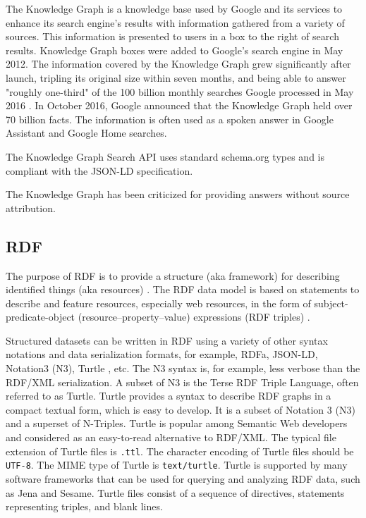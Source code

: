 The Knowledge Graph is a knowledge base used by Google and its services to enhance its search engine's results with information gathered from a variety of sources. This information is presented to users in a box to the right of search results. Knowledge Graph boxes were added to Google's search engine in May 2012. The information covered by the Knowledge Graph grew significantly after launch, tripling its original size within seven months, and being able to answer "roughly one-third" of the 100 billion monthly searches Google processed in May 2016 \cite{Knowledge_Graph}.
In October 2016, Google announced that the Knowledge Graph held over 70 billion facts. The information is often used as a spoken answer in Google Assistant and Google Home searches. 

The Knowledge Graph Search API uses standard schema.org types and is compliant with the JSON-LD specification.

The Knowledge Graph has been criticized for providing answers without source attribution.

\subsection{RDF}
\label{sec:RDF}
The purpose of RDF is to provide a structure (aka framework)
for describing identified things (aka resources) \cite{RDFandOWL_SenmanticWebAffinityGroup}.
The RDF data model is based on statements to describe and feature resources, especially web resources, in the form of subject-predicate-object (resource–property–value) expressions (RDF triples) \cite{rdf-triples}.

Structured datasets can be written in RDF using a variety of other syntax notations and data serialization formats, for example, RDFa, JSON-LD, Notation3 (N3), Turtle \cite{rdfTurtle}, etc. The N3 syntax is, for example, less verbose than the RDF/XML serialization. A subset of N3 is the Terse RDF Triple Language, often referred to as Turtle. Turtle provides a syntax to describe RDF graphs in a compact textual form, which is easy to develop. It is a subset of Notation 3 (N3) and a superset of N-Triples. Turtle is popular among Semantic Web developers and considered as an easy-to-read alternative to RDF/XML. The typical file extension of Turtle files is \texttt{.ttl}. The character encoding of Turtle files should be \texttt{UTF-8}. The MIME type of Turtle is \texttt{text/turtle}. Turtle is supported by many software frameworks that can be used for querying and analyzing RDF data, such as Jena and Sesame. Turtle files consist of a sequence of directives, statements representing triples, and blank lines.

